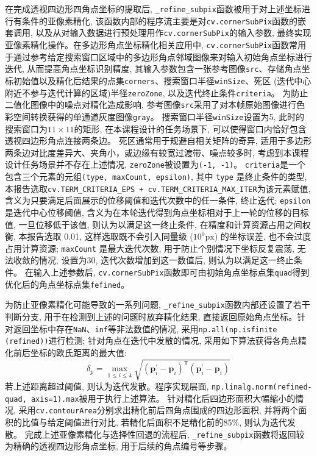 在完成透视四边形四角点坐标的提取后, \texttt{\_refine\_subpix}函数被用于对上述坐标进行有条件的亚像素精化, 该函数内部的程序流主要是对\texttt{cv.cornerSubPix}函数的嵌套调用, 以及从对输入数据进行预处理用作\texttt{cv.cornerSubPix}的输入参数, 最终实现亚像素精化操作。在多边形角点坐标精化相关应用中, \texttt{cv.cornerSubPix}函数常用于通过参考给定搜索窗口区域中的多边形角点邻域图像来对输入初始角点坐标进行迭代, 从而提高角点坐标识别精度, 其输入参数包含一张参考图像\texttt{src}、存储角点坐标初始值以及精化后结果的点集\texttt{corners}、搜索窗口半径\texttt{winSize}、死区 (迭代中心附近不参与迭代计算的区域)半径\texttt{zeroZone}, 以及迭代终止条件\texttt{criteria}。
为防止二值化图像中的噪点对精化造成影响, 参考图像\texttt{src}采用了对本帧原始图像进行色彩空间转换获得的单通道灰度图像\texttt{gray}。
搜索窗口半径\texttt{winSize}设置为5, 此时的搜索窗口为$11\times 11$的矩形, 在本课程设计的任务场景下, 可以使得窗口内恰好包含透视四边形角点连接两条边。
死区通常用于规避自相关矩阵的奇异, 适用于多边形两条边对比度差异大、夹角小，或边缘有较宽过渡带、噪点较多时, 考虑到本课程设计任务场景并不存在上述情况, \texttt{zeroZone}被设置为\texttt{(-1, -1)}。
\texttt{criteria}是一个包含三个元素的元组\texttt{(type, maxCount, epsilon)}, 其中 \texttt{type} 是终止条件的类型, 本报告选取\texttt{cv.TERM\_CRITERIA\_EPS + cv.TERM\_CRITERIA\_MAX\_ITER}为该元素赋值, 含义为只要满足后面展示的位移阈值和迭代次数中的任一条件, 终止迭代; \texttt{epsilon} 是迭代中心位移阈值, 含义为在本轮迭代得到角点坐标相对于上一轮的位移的目标值, 一旦位移低于该值, 则认为以满足这一终止条件, 在精度和计算资源占用之间权衡, 本报告选取 0.01, 这样选取既不会引入同量级 ($10^0 \mathrm{px}$) 的坐标误差, 也不会过度占用计算资源; \texttt{maxCount} 是最大迭代次数, 用于防止个别情况下坐标反复震荡, 无法收敛的情况, 设置为30, 迭代次数增加到这一数值后, 则认为以满足这一终止条件。
在输入上述参数后, \texttt{cv.cornerSubPix}函数即可由初始角点坐标点集\texttt{quad}得到优化后的角点坐标点集\texttt{fefined}。

为防止亚像素精化可能导致的一系列问题, \texttt{\_refine\_subpix}函数内部还设置了若干判断分支, 用于在检测到上述的问题时放弃精化结果, 直接返回原始角点坐标。针对返回坐标中存在\texttt{NaN}、\texttt{inf}等非法数值的情况, 采用\texttt{np.all(np.isfinite (refined))}进行检测; 针对角点在迭代中发散的情况, 采用如下算法获得各角点精化前后坐标的欧氏距离的最大值:
\begin{equation}
  \delta_p = 
  \max_{1\le i\le4}\sqrt{\left(\boldsymbol{p}_{i}^{\prime}-\boldsymbol{p}_{i}\right)^{\mathsf{T}}\left(\boldsymbol{p}_{i}^{\prime}-\boldsymbol{p}_{i}\right)}
\end{equation}
若上述距离超过阈值, 则认为迭代发散。程序实现层面, \texttt{np.linalg.norm(refined-quad, axis=1).max}被用于执行上述算法。
针对精化后四边形面积大幅缩小的情况, 采用\texttt{cv.contourArea}分别求出精化前后四角点围成的四边形面积, 并将两个面积的比值与给定阈值进行对比, 若精化后面积不足精化前的85\%, 则认为迭代发散。
完成上述亚像素精化与选择性回退的流程后, \texttt{\_refine\_subpix}函数将返回较为精确的透视四边形角点坐标, 用于后续的角点编号等步骤。

